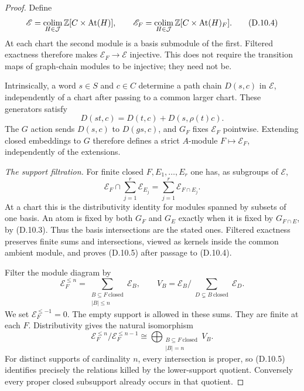 \begin{proof}
Define
\[
 \mathscr E=\operatorname*{colim}_{H\in\mathcal J}
                  \mathbb Z[C\times\operatorname{At}(H)],\qquad
 \mathscr E_F=\operatorname*{colim}_{H\in\mathcal J}
                  \mathbb Z[C\times\operatorname{At}(H)_F].
 \tag{D.10.4}
\]
At each chart the second module is a basis submodule of the
first. Filtered exactness therefore makes
$\mathscr E_F\to\mathscr E$ injective. This does not require
the transition maps of graph-chain modules to be injective;
they need not be.

Intrinsically, a word $s\in S$ and $c\in C$ determine a path
chain $D(s,c)$ in $\mathscr E$, independently of a chart after
passing to a common larger chart. These generators satisfy
\[
        D(st,c)=D(t,c)+D(s,\rho(t)c).
\]
The $G$ action sends $D(s,c)$ to $D(gs,c)$, and $G_F$ fixes
$\mathscr E_F$ pointwise. Extending closed embeddings to $G$
therefore defines a strict $A$-module $F\mapsto\mathscr E_F$,
independently of the extensions.

\emph{The support filtration.}
For finite closed $F,E_1,\ldots,E_r$ one has, as subgroups of
$\mathscr E$,
\[
 \mathscr E_F\cap\sum_{j=1}^r\mathscr E_{E_j}
                  =\sum_{j=1}^r\mathscr E_{F\cap E_j}.
 \tag{D.10.5}
\]
At a chart this is the distributivity identity for modules
spanned by subsets of one basis. An atom is fixed by both
$G_F$ and $G_E$ exactly when it is fixed by $G_{F\cap E}$,
by (D.10.3). Thus the basis intersections are the stated ones.
Filtered exactness preserves finite sums and intersections,
viewed as kernels inside the common ambient module, and proves
(D.10.5) after passage to (D.10.4).

Filter the module diagram by
\[
 \mathscr E_F^{\leq n}
       =\sum_{\substack{B\subseteq F\ \mathrm{closed}\\|B|\leq n}}
                        \mathscr E_B,
 \qquad
 V_B=\mathscr E_B\Big/
       \sum_{\substack{D\subsetneq B\ \mathrm{closed}}}\mathscr E_D.
\]
We set $\mathscr E_F^{\leq-1}=0$.
The empty support is allowed in these sums. They are finite at
each $F$. Distributivity gives the natural isomorphism
\[
 \mathscr E_F^{\leq n}/\mathscr E_F^{\leq n-1}
       \cong
       \bigoplus_{\substack{B\subseteq F\ \mathrm{closed}\\|B|=n}}V_B.
 \tag{D.10.6}
\]
For distinct supports of cardinality $n$, every intersection is
proper, so (D.10.5) identifies precisely the relations killed
by the lower-support quotient. Conversely every proper closed
subsupport already occurs in that quotient.


\end{proof}
